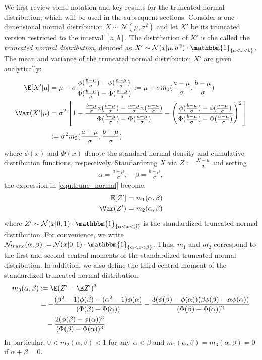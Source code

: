 We first review some notation and key results for the truncated normal distribution, which will be used in the subsequent sections.
Consider a one-dimensional normal distribution $X \sim \mathcal{N}(\mu, \sigma^2)$ and let $X'$ be its truncated version restricted to the interval $[a, b]$.
The distribution of $X'$ is the called the \textsl{truncated normal distribution}, denoted as $X' \sim \mathcal{N}(x|\mu, \sigma^2) \cdot \mathbbm{1}_{\{a<x<b\}}$.
The mean and variance of the truncated normal distribution $X'$ are given analytically:
\begin{align}
    \E[X'|\mu] &= \mu - \sigma \frac{\phi(\frac{b-\mu}{\sigma}) - \phi(\frac{a-\mu}{\sigma})}{\Phi(\frac{b-\mu}{\sigma}) - \Phi(\frac{a-\mu}{\sigma})} := \mu + \sigma m_1(\frac{a-\mu}{\sigma}, \frac{b-\mu}{\sigma}) \notag\\
    \Var(X'|\mu) &= \sigma^2 \left[ 1 - \frac{\frac{b-\mu}{\sigma} \phi(\frac{b-\mu}{\sigma}) - \frac{a-\mu}{\sigma} \phi(\frac{a-\mu}{\sigma})}{\Phi(\frac{b-\mu}{\sigma}) - \Phi(\frac{a-\mu}{\sigma})} - \left( \frac{\phi(\frac{b-\mu}{\sigma}) - \phi(\frac{a-\mu}{\sigma})}{\Phi(\frac{b-\mu}{\sigma}) - \Phi(\frac{a-\mu}{\sigma})} \right)^2 \right]\notag\\
    &:= \sigma^2 m_2(\frac{a-\mu}{\sigma},\frac{b-\mu}{\sigma}) \label{equ:trunc_normal}
\end{align}
where $\phi(x)$ and $\Phi(x)$ denote the standard normal density and cumulative distribution functions, respectively.
Standardizing $X$ via $Z := \frac{X-\mu}{\sigma}$ and setting
\begin{align}
\alpha = \frac{a - \mu}{\sigma}, \quad \beta = \frac{b - \mu}{\sigma}, \label{equ:alpha_beta}
\end{align}
the expression in \eqref{equ:trunc_normal} become:
\begin{align}
    \mathbb{E}[Z'] &= m_1(\alpha, \beta) \notag\\
    \Var(Z') &= m_2(\alpha, \beta) \label{equ:trunc_normal_standard}
\end{align}
where $Z'\sim \mathcal{N}(x|0, 1) \cdot \mathbbm{1}_{\{\alpha<x<\beta\}}$ is the standardized truncated normal distribution.
For convenience, we write $\mathcal{N}_{trunc}(\alpha, \beta) := \mathcal{N}(x|0, 1) \cdot \mathbbm{1}_{\{\alpha<x<\beta\}}$.
Thus, $m_1$ and $m_2$ correspond to the first and second central moments of the standardized truncated normal distribution.
In addition, we also define the third central moment  of the standardized truncated normal distribution:
\begin{align}\label{equ:trunc_normal_standard2}
    m_3(\alpha, \beta) &:= \E(Z'-\E Z')^3 \notag\\
&= -\frac{(\beta^2 - 1)\phi(\beta) - (\alpha^2 - 1)\phi(\alpha)}{(\Phi(\beta) - \Phi(\alpha))} - \frac{3(\phi(\beta) - \phi(\alpha))(\beta\phi(\beta) - \alpha\phi(\alpha))}{(\Phi(\beta) - \Phi(\alpha))^2} \notag\\
&\quad - \frac{2(\phi(\beta) - \phi(\alpha))^3}{(\Phi(\beta) - \Phi(\alpha))^3}.
\end{align}
In particular, $0<m_2(\alpha,\beta)<1$ for any $\alpha<\beta$ and $m_1(\alpha,\beta)=m_3(\alpha,\beta)=0$ if $\alpha+\beta=0$.



